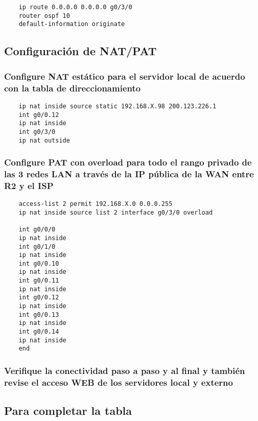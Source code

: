 \documentclass[twocolumn]{article}
\begin{document}
    \begin{verbatim}
    ip route 0.0.0.0 0.0.0.0 g0/3/0
    router ospf 10
    default-information originate
    \end{verbatim}
    
    \subsection*{Configuración de NAT/PAT}
    
    \subsubsection*{Configure NAT estático para el servidor local de acuerdo con la tabla de direccionamiento}
    
    \begin{verbatim}
    ip nat inside source static 192.168.X.98 200.123.226.1
    int g0/0.12
    ip nat inside
    int g0/3/0
    ip nat outside
    \end{verbatim}
    
    \subsubsection*{Configure PAT con overload para todo el rango privado de las 3 redes LAN a través de la IP pública de la WAN entre R2 y el ISP}
    
    \begin{verbatim}
    access-list 2 permit 192.168.X.0 0.0.0.255
    ip nat inside source list 2 interface g0/3/0 overload
    
    int g0/0/0
    ip nat inside
    int g0/1/0
    ip nat inside
    int g0/0.10
    ip nat inside
    int g0/0.11
    ip nat inside
    int g0/0.12
    ip nat inside
    int g0/0.13
    ip nat inside
    int g0/0.14
    ip nat inside
    end
    \end{verbatim}
    
    \subsubsection*{Verifique la conectividad paso a paso y al final y también revise el acceso WEB de los servidores local y externo}
    
    \subsection*{Para completar la tabla}
    
\end{document}
